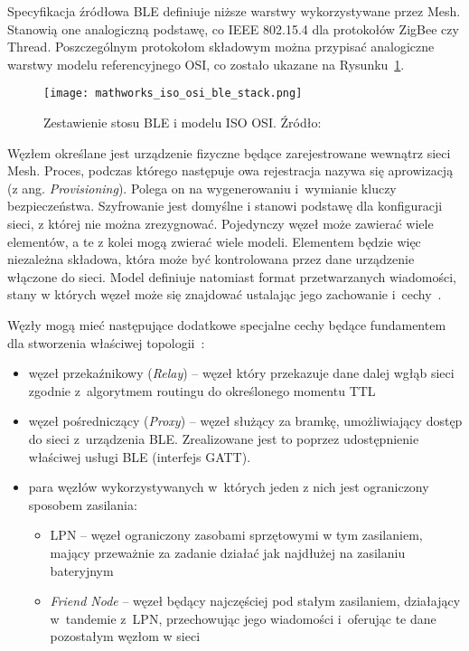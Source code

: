 Specyfikacja źródłowa BLE definiuje niższe warstwy wykorzystywane przez Mesh. Stanowią one analogiczną podstawę,
co IEEE 802.15.4 dla protokołów ZigBee czy Thread. Poszczególnym protokołom składowym można przypisać analogiczne
warstwy modelu referencyjnego OSI, co zostało ukazane na Rysunku~\ref{rys:agregacja_protokolow_ble}.

\begin{figure}[!ht]
	\centering \texttt{[image: mathworks\_iso\_osi\_ble\_stack.png]} 
	\caption{Zestawienie stosu BLE i modelu ISO OSI. Źródło: \cite{noauthor_bluetooth_nodate}}
	\label{rys:agregacja_protokolow_ble}
\end{figure}


Węzłem określane jest urządzenie fizyczne będące zarejestrowane wewnątrz sieci Mesh. Proces, podczas którego 
następuje owa rejestracja nazywa się aprowizacją (z ang. \textit{Provisioning}). Polega on na wygenerowaniu
i~wymianie kluczy bezpieczeństwa. Szyfrowanie jest domyślne i stanowi podstawę dla konfiguracji sieci,
z której nie można zrezygnować. Pojedynczy węzeł może zawierać wiele elementów,
a te z kolei mogą zwierać wiele modeli. Elementem będzie więc niezależna składowa, która może być kontrolowana
przez dane urządzenie włączone do sieci. Model definiuje natomiast format przetwarzanych wiadomości, stany w których
węzeł może się znajdować ustalając jego zachowanie i~cechy~\cite{woolley_bluetooth_2020, st_an5292_2021}.

Węzły mogą mieć następujące dodatkowe specjalne cechy będące fundamentem dla stworzenia właściwej topologii~\cite{woolley_bluetooth_2020, st_an5292_2021}:
\begin{itemize}
\item węzeł przekaźnikowy (\textit{Relay}) -- węzeł który przekazuje dane dalej wgłąb sieci zgodnie z~algorytmem routingu do określonego momentu \gls{TTL}
\item węzeł pośredniczący (\textit{Proxy}) -- węzeł służący za bramkę, umożliwiający dostęp do sieci z~urządzenia BLE. Zrealizowane jest to poprzez
udostępnienie właściwej usługi BLE (interfejs GATT).
\item para węzłów wykorzystywanych w~których jeden z nich jest ograniczony sposobem zasilania:
	\begin{itemize}
	\item \gls{LPN} -- węzeł ograniczony zasobami sprzętowymi w tym zasilaniem, mający przeważnie za zadanie działać jak najdłużej na zasilaniu bateryjnym
	\item \textit{Friend Node} -- węzeł będący najczęściej pod stałym zasilaniem, działający w~tandemie z~\gls{LPN}, przechowując jego wiadomości
	i~oferując te dane pozostałym węzłom w sieci
	\end{itemize}
\end{itemize}

